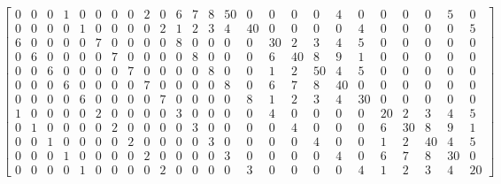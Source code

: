 \documentclass{article}
\begin{document}
\begin{mdDiv}[class={math,para-block},elem={math},data-line={95}]
\begin{mdDiv}[class={mathdisplay,para-block,input-math},elem={mathdisplay},color={},math-needpdf={},line-adjust={0},data-line={96}]
\begin{mdDiv}[class={mathdisplay,math-display},color={},math-needpdf={}]
\[\begin{bmatrix}
0  & 0  & 0  & 1  & 0  & 0  & 0  & 0  & 2  & 0  & 6  & 7  & 8  & 50 &  0 &  0 &  0 &  0 &  4 &  0 &  0 &  0 &  0 &  5 &  0 \\
0  & 0  & 0  & 0  & 1  & 0  & 0  & 0  & 0  & 2  & 1  & 2  & 3  & 4  & 40 &  0 &  0 &  0 &  0 &  4 &  0 &  0 &  0 &  0 &  5 \\
6  & 0  & 0  & 0  & 0  & 7  & 0  & 0  & 0  & 0  & 8  & 0  & 0  & 0  & 0  & 30 &  2 &  3 &  4 &  5 &  0 &  0 &  0 &  0 &  0 \\
0  & 6  & 0  & 0  & 0  & 0  & 7  & 0  & 0  & 0  & 0  & 8  & 0  & 0  & 0  & 6  & 40 &  8 &  9 &  1 &  0 &  0 &  0 &  0 &  0 \\
0  & 0  & 6  & 0  & 0  & 0  & 0  & 7  & 0  & 0  & 0  & 0  & 8  & 0  & 0  & 1  & 2  & 50 &  4 &  5 &  0 &  0 &  0 &  0 &  0 \\
0  & 0  & 0  & 6  & 0  & 0  & 0  & 0  & 7  & 0  & 0  & 0  & 0  & 8  & 0  & 6  & 7  & 8  & 40 &  0 &  0 &  0 &  0 &  0 &  0 \\
0  & 0  & 0  & 0  & 6  & 0  & 0  & 0  & 0  & 7  & 0  & 0  & 0  & 0  & 8  & 1  & 2  & 3  & 4  & 30 &  0 &  0 &  0 &  0 &  0 \\
1  & 0  & 0  & 0  & 0  & 2  & 0  & 0  & 0  & 0  & 3  & 0  & 0  & 0  & 0  & 4  & 0  & 0  & 0  & 0  & 20 &  2 &  3 &  4 &  5 \\
0  & 1  & 0  & 0  & 0  & 0  & 2  & 0  & 0  & 0  & 0  & 3  & 0  & 0  & 0  & 0  & 4  & 0  & 0  & 0  & 6  & 30 &  8 &  9 &  1 \\
0  & 0  & 1  & 0  & 0  & 0  & 0  & 2  & 0  & 0  & 0  & 0  & 3  & 0  & 0  & 0  & 0  & 4  & 0  & 0  & 1  & 2  & 40 &  4 &  5 \\
0  & 0  & 0  & 1  & 0  & 0  & 0  & 0  & 2  & 0  & 0  & 0  & 0  & 3  & 0  & 0  & 0  & 0  & 4  & 0  & 6  & 7  & 8  & 30 &  0 \\
0  & 0  & 0  & 0  & 1  & 0  & 0  & 0  & 0  & 2  & 0  & 0  & 0  & 0  & 3  & 0  & 0  & 0  & 0  & 4  & 1  & 2  & 3  & 4  & 20
\end{bmatrix}
\]%
\end{mdDiv}%
\end{mdDiv}%
\end{mdDiv}%
\end{document}
